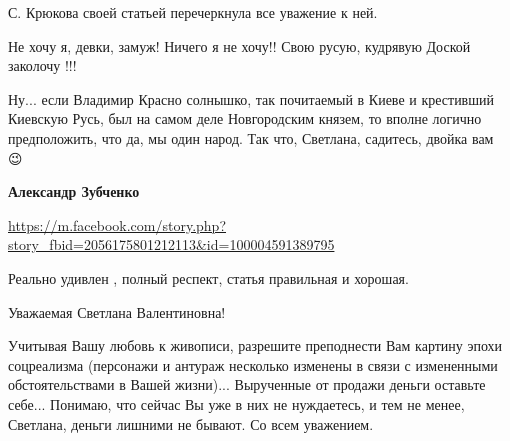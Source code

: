 \begin{itemize}
С. Крюкова своей статьей перечеркнула все уважение к ней.

 
Не хочу я, девки, замуж! Ничего я не хочу!! Свою русую, кудрявую Доской заколочу !!!

 
Ну... если Владимир Красно солнышко, так почитаемый в Киеве и крестивший
Киевскую Русь, был на самом деле Новгородским князем, то вполне логично
предположить, что да, мы один народ. Так что, Светлана, садитесь, двойка вам 😉

 
\textbf{Александр Зубченко} 

\url{https://m.facebook.com/story.php?story_fbid=2056175801212113&id=100004591389795}

 
Реально удивлен , полный респект, статья правильная и хорошая.

 

Уважаемая Светлана Валентиновна!

Учитывая Вашу любовь к живописи, разрешите преподнести Вам картину эпохи
соцреализма (персонажи и антураж несколько изменены в связи с измененными
обстоятельствами в Вашей жизни)... Вырученные от продажи деньги оставьте
себе... Понимаю, что сейчас Вы уже в них не нуждаетесь, и тем не менее,
Светлана, деньги лишними не бывают. Со всем уважением.


\end{itemize}
